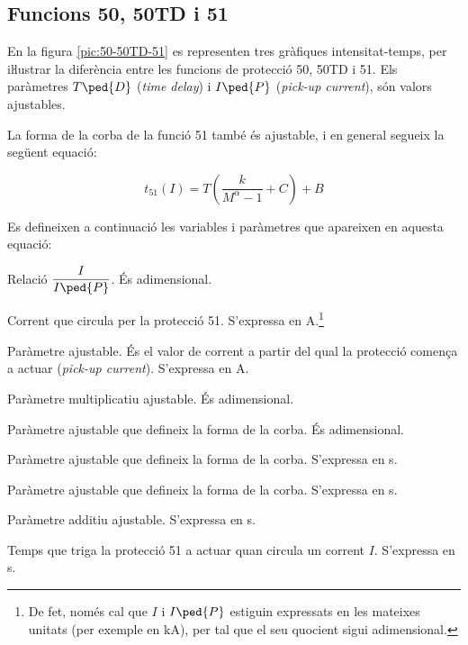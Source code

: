 \subsection{Funcions 50, 50TD i 51}

En la figura \vref{pic:50-50TD-51} es representen tres gràfiques intensitat-temps, per iŀlustrar la diferència entre les funcions de protecció 50, 50TD i 51. Els paràmetres $T\ped{D}$ (\textit{time delay}) i $I\ped{P}$ (\textit{pick-up current}), són valors ajustables.
\begin{center}
	
	\label{pic:50-50TD-51}
\end{center}

\break
La forma de la corba de la funció 51 també és ajustable, i en general segueix la següent equació:

\begin{equation}\label{eq:corba-50-51}
	t_{51}(I) = T \left( \frac{k}{M^\alpha -1} + C \right) + B
\end{equation}

Es defineixen a continuació les variables i paràmetres que apareixen en aquesta equació:
\begin{list}{}
	{\setlength{\labelwidth}{15mm} \setlength{\leftmargin}{15mm} \setlength{\labelsep}{5mm}}
	\item[$M$] Relació $\dfrac{I}{I\ped{P}}$. És adimensional.
	\item[$I$] Corrent que circula per la protecció 51. S'expressa en A.\footnote{\label{fn:I-Ip}De fet, només cal que $I$ i $I\ped{P}$ estiguin expressats en les mateixes unitats (per exemple en kA), per tal  que el seu quocient sigui adimensional.}
	\item[$I\ped{P}$] Paràmetre ajustable. És el valor de corrent a partir del qual la  protecció comença a actuar (\textit{pick-up current}). S'expressa en A.
	\item[$T$] Paràmetre multiplicatiu ajustable. És adimensional.
	\item[$\alpha$] Paràmetre ajustable que defineix la forma de la corba. És adimensional.
	\item[$k$] Paràmetre ajustable que defineix la forma de la corba. S'expressa en s.
	\item[$C$] Paràmetre ajustable que defineix la forma de la corba. S'expressa en s.
	\item[$B$] Paràmetre additiu ajustable. S'expressa en s.
	\item[$t_{51}(I)$] Temps que triga la protecció 51 a actuar quan circula un corrent $I$. S'expressa en s.
\end{list}

